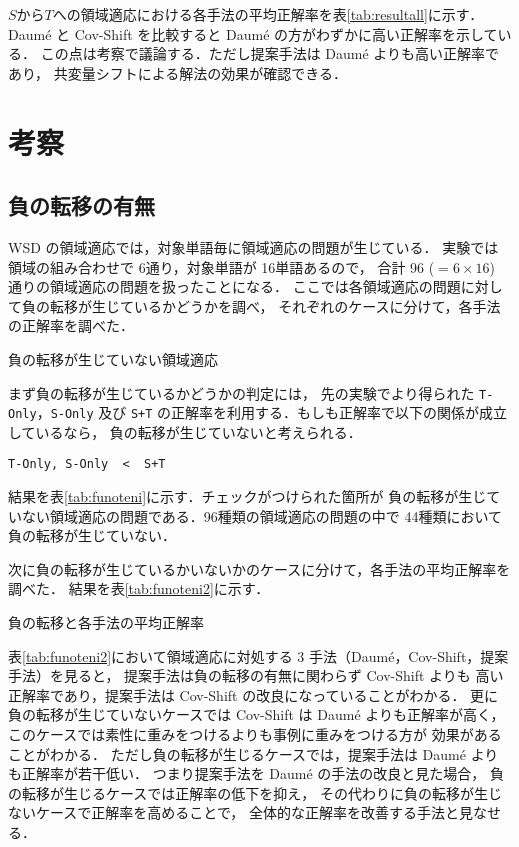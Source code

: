 \documentclass[japanese]{jnlp_1.4}
\begin{document}
\( S \)から\( T \)への領域適応における各手法の平均正解率を\mbox{表\ref{tab:resultall}}に示す．
Daum{\'e} と Cov-Shift を比較すると Daum{\'e} の方がわずかに高い正解率を示している．
この点は考察で議論する．ただし提案手法は Daum{\'e} よりも高い正解率であり，
共変量シフトによる解法の効果が確認できる．



\section{考察}

\subsection{負の転移の有無}

WSD の領域適応では，対象単語毎に領域適応の問題が生じている．
実験では領域の組み合わせで 6通り，対象単語が 16単語あるので，
合計 96 ($= 6 \times 16$) 通りの領域適応の問題を扱ったことになる．
ここでは各領域適応の問題に対して負の転移が生じているかどうかを調べ，
それぞれのケースに分けて，各手法の正解率を調べた．

\begin{table}[b]
\caption{負の転移が生じていない領域適応}
\label{tab:funoteni}

\end{table}

まず負の転移が生じているかどうかの判定には，
先の実験でより得られた
\verb|T-Only|，\verb|S-Only| 及び
\verb|S+T| の正解率を利用する．もしも正解率で以下の関係が成立しているなら，
負の転移が生じていないと考えられる．
\begin{center}
\verb|T-Only, S-Only  <  S+T| 
\end{center}
結果を\mbox{表\ref{tab:funoteni}}に示す．チェックがつけられた箇所が
負の転移が生じていない領域適応の問題である．96種類の領域適応の問題の中で
44種類において負の転移が生じていない．


次に負の転移が生じているかいないかのケースに分けて，各手法の平均正解率を調べた．
結果を\mbox{表\ref{tab:funoteni2}}に示す．

\begin{table}[t]
\caption{負の転移と各手法の平均正解率}
\label{tab:funoteni2}

\end{table}

\mbox{表\ref{tab:funoteni2}}において領域適応に対処する 3 手法（Daum{\'e}，Cov-Shift，提案手法）を見ると，
提案手法は負の転移の有無に関わらず Cov-Shift よりも
高い正解率であり，提案手法は Cov-Shift の改良になっていることがわかる．
更に負の転移が生じていないケースでは Cov-Shift は Daum{\'e} よりも正解率が高く，
このケースでは素性に重みをつけるよりも事例に重みをつける方が
効果があることがわかる．
ただし負の転移が生じるケースでは，提案手法は Daum{\'e} よりも正解率が若干低い．
つまり提案手法を Daum{\'e} の手法の改良と見た場合，
負の転移が生じるケースでは正解率の低下を抑え，
その代わりに負の転移が生じないケースで正解率を高めることで，
全体的な正解率を改善する手法と見なせる．
\end{document}
